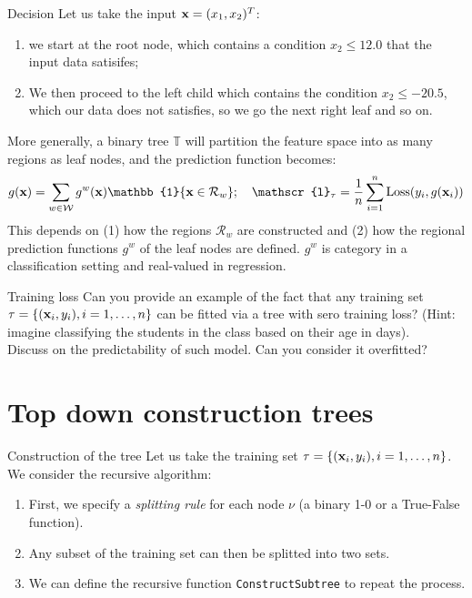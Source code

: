 \documentclass{beamer}
\begin{document}
\begin{frame}{Decision}
    Let us take the input $\textbf{x}=(x_1,x_2)^T$:
    \begin{enumerate}
        \item we start at the root node, which contains a condition $x_2\leq 12.0$ that the input data satisifes;
        \item We then proceed to the left child which contains the condition $x_2 \leq -20.5$, which our data does not satisfies, so we go the next right leaf and so on.
    \end{enumerate}
    More generally, a binary tree $\mathbb{T}$ will partition the feature space into as many regions as leaf nodes, and the prediction function becomes:
    \[
        g(\uvec{x})=\sum_{w\in\mathcal{W}}g^w (\uvec{x})\mathbb{1}\{\uvec{x}\in \mathcal{R}_w\};   \quad 
        \mathscr{l}_{\tau}=\frac{1}{n}\sum_{i=1}^n \mathrm{Loss}(y_i,g(\uvec{x}_i))
    \]
    This depends on (1) how the regions $\mathcal{R}_w$ are constructed and (2) how the regional prediction functions $g^w$ of the leaf nodes are defined. $g^w$ is category in a classification setting and real-valued in regression.
\end{frame}

\begin{frame}
    \begin{Exercise}{Training loss}
        \label{Ex:trainigloss}
        Can you provide an example of the fact that any training set $\tau = \{(\textbf{x}_i,y_i),i=1,\ldots,n\}$ can be fitted via a tree with sero training loss? (Hint: imagine classifying the students in the class based on their age in days).
        \\[10pt]
        Discuss on the predictability of such model. Can you consider it overfitted?
    \end{Exercise}
\end{frame}

\section{Top down construction trees}

\begin{frame}[fragile]{Construction of the tree}
    Let us take the training set $\tau = \{(\textbf{x}_i,y_i),i=1,\ldots,n\}$. We consider the recursive algorithm:
    \begin{enumerate}
        \item First, we specify a {\em splitting rule} for each node $\nu$ (a binary 1-0 or a True-False function).
        \item Any subset of the training set can then be splitted into two sets.
        \item We can define the recursive function \texttt{ConstructSubtree} to repeat the process.
    \end{enumerate}
\end{frame}
\end{document}
